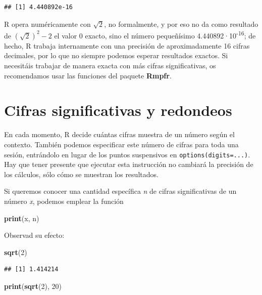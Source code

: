 \documentclass[]{book}
\newenvironment{Shaded}{\begin{snugshade}}{\end{snugshade}}
\newcommand{\DecValTok}[1]{\textcolor[rgb]{0.00,0.00,0.81}{#1}}
\newcommand{\KeywordTok}[1]{\textcolor[rgb]{0.13,0.29,0.53}{\textbf{#1}}}
\newcommand{\NormalTok}[1]{#1}
\theoremstyle{definition}
\theoremstyle{definition}
\theoremstyle{definition}
\theoremstyle{remark}
\begin{document}
\begin{verbatim}
## [1] 4.440892e-16
\end{verbatim}

R opera numéricamente con \(\sqrt{2}\), no formalmente,
y por eso no da como resultado de \((\sqrt{2})^2-2\) el valor 0 exacto, sino
el número pequeñísimo 4.440892·10\textsuperscript{-16}; de hecho, R trabaja internamente con una precisión de aproximadamente 16 cifras decimales, por lo que no siempre podemos esperar resultados exactos. Si necesitáis trabajar de manera exacta con más cifras significativas, os recomendamos usar las funciones del paquete \textbf{Rmpfr}.

\hypertarget{cifras-significativas-y-redondeos}{%
\section{Cifras significativas y redondeos}\label{cifras-significativas-y-redondeos}}

En cada momento, R decide cuántas cifras muestra de un número según el contexto. También podemos especificar este número de cifras para toda una sesión, entrándolo en lugar de los puntos suspensivos en \texttt{options(digits=...)}. Hay que tener presente que ejecutar esta instrucción no cambiará la precisión de los cálculos, sólo cómo se muestran los resultados.

Si queremos conocer una cantidad específica \emph{n} de cifras significativas de un número \emph{x}, podemos emplear la función

\begin{Shaded}
\begin{Highlighting}[]
\KeywordTok{print}\NormalTok{(x, n)}
\end{Highlighting}
\end{Shaded}

Observad su efecto:

\begin{Shaded}
\begin{Highlighting}[]
\KeywordTok{sqrt}\NormalTok{(}\DecValTok{2}\NormalTok{)}
\end{Highlighting}
\end{Shaded}

\begin{verbatim}
## [1] 1.414214
\end{verbatim}

\begin{Shaded}
\begin{Highlighting}[]
\KeywordTok{print}\NormalTok{(}\KeywordTok{sqrt}\NormalTok{(}\DecValTok{2}\NormalTok{), }\DecValTok{20}\NormalTok{)}
\end{Highlighting}
\end{Shaded}
\end{document}
